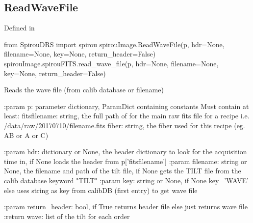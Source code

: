 \begin{minipage}{\textwidth}
\subsection{ReadWaveFile}

Defined in \spirouImage{}

\begin{pythonbox}
from SpirouDRS import spirou
spirouImage.ReadWaveFile(p, hdr=None, filename=None, key=None, return_header=False)
spirouImage.spirouFITS.read_wave_file(p, hdr=None, filename=None, key=None, return_header=False)
\end{pythonbox}

\begin{pythondocstring}
Reads the wave file (from calib database or filename)

:param p: parameter dictionary, ParamDict containing constants
    Must contain at least:
            fitsfilename: string, the full path of for the main raw fits
                          file for a recipe
                          i.e. /data/raw/20170710/filename.fits
            fiber: string, the fiber used for this recipe (eg. AB or A or C)

:param hdr: dictionary or None, the header dictionary to look for the
                 acquisition time in, if None loads the header from
                 p['fitsfilename']
:param filename: string or None, the filename and path of the tilt file,
                 if None gets the TILT file from the calib database
                 keyword "TILT"
:param key: string or None, if None key='WAVE' else uses string as key
            from calibDB (first entry) to get wave file

:param return_header: bool, if True returns header file else just returns
                      wave file
:return wave: list of the tilt for each order
\end{pythondocstring}
\end{minipage}


